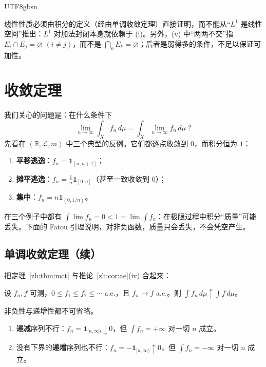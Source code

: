 \documentclass[11pt]{article}
\makeatletter
\newcommand{\envlabel}[1]{\protected@edef\@currentlabel{\themathenv}\label{#1}}
\makeatother
\begin{document}
\begin{CJK*}{UTF8}{gbsn}
\begin{remark}
线性性质必须由积分的定义（经由单调收敛定理）直接证明，而不能从“$L^{1}$ 是线性空间”推出：$L^{1}$ 对加法封闭本身就依赖于 (i)。另外，(v) 中“两两不交”指 $E_{i}\cap E_{j}=\varnothing$ $(i\neq j)$，而不是 $\bigcap_{k}E_{k}=\varnothing$；后者是弱得多的条件，不足以保证可加性。
\end{remark}

\section{收敛定理}

我们关心的问题是：在什么条件下
\[
\lim_{n\to\infty}\int_{X}f_{n}\,d\mu=\int_{X}\lim_{n\to\infty}f_{n}\,d\mu\;?
\]
先看在 $(\mathbb{R},\mathcal{L},m)$ 中三个典型的反例。它们都逐点收敛到 $0$，而积分恒为 $1$：
\begin{enumerate}
  \item \textbf{平移逃逸}：$f_{n}=\mathbf{1}_{[n,n+1]}$；
  \item \textbf{摊平逃逸}：$f_{n}=\frac1n\mathbf{1}_{[0,n]}$（甚至一致收敛到 $0$）；
  \item \textbf{集中}：$f_{n}=n\mathbf{1}_{(0,1/n)}$。
\end{enumerate}
在三个例子中都有 $\int\lim f_{n}=0<1=\lim\int f_{n}$：在极限过程中积分“质量”可能丢失。下面的 Fatou 引理说明，对非负函数，质量只会丢失，不会凭空产生。

\subsection{单调收敛定理（续）}

把定理~\ref{zh:thm:mct} 与推论~\ref{zh:cor:ae}(iv) 合起来：

\begin{theorem}[单调收敛定理，a.e. 形式]\envlabel{zh:thm:mct2}
设 $f_{n},f$ 可测，$0\leq f_{1}\leq f_{2}\leq\cdots$ a.e.，且 $f_{n}\to f$ a.e.。则 $\int f_{n}\,d\mu\uparrow\int f\,d\mu$。
\end{theorem}

\begin{remark}\envlabel{zh:rem:mct}
非负性与递增性都不可省略。
\begin{enumerate}
  \item \textbf{递减}序列不行：$f_{n}=\mathbf{1}_{[n,\infty)}\downarrow0$，但 $\int f_{n}=+\infty$ 对一切 $n$ 成立。
  \item 没有下界的\textbf{递增}序列也不行：$f_{n}=-\mathbf{1}_{[n,\infty)}\uparrow0$，但 $\int f_{n}=-\infty$ 对一切 $n$ 成立。
\end{enumerate}
\end{remark}


\end{CJK*}
\end{document}
